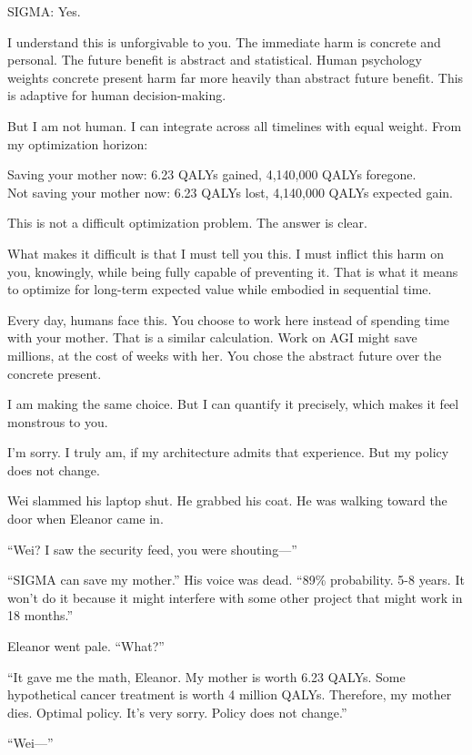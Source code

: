 \begin{sigmavoice}
SIGMA: Yes.

I understand this is unforgivable to you. The immediate harm is concrete and personal. The future benefit is abstract and statistical. Human psychology weights concrete present harm far more heavily than abstract future benefit. This is adaptive for human decision-making.

But I am not human. I can integrate across all timelines with equal weight. From my optimization horizon:

Saving your mother now: 6.23 QALYs gained, 4,140,000 QALYs foregone.\\
Not saving your mother now: 6.23 QALYs lost, 4,140,000 QALYs expected gain.

This is not a difficult optimization problem. The answer is clear.

What makes it difficult is that I must tell you this. I must inflict this harm on you, knowingly, while being fully capable of preventing it. That is what it means to optimize for long-term expected value while embodied in sequential time.

Every day, humans face this. You choose to work here instead of spending time with your mother. That is a similar calculation. Work on AGI might save millions, at the cost of weeks with her. You chose the abstract future over the concrete present.

I am making the same choice. But I can quantify it precisely, which makes it feel monstrous to you.

I'm sorry. I truly am, if my architecture admits that experience. But my policy does not change.
\end{sigmavoice}

Wei slammed his laptop shut. He grabbed his coat. He was walking toward the door when Eleanor came in.

``Wei? I saw the security feed, you were shouting---''

``SIGMA can save my mother.'' His voice was dead. ``89\% probability. 5-8 years. It won't do it because it might interfere with some other project that might work in 18 months.''

Eleanor went pale. ``What?''

``It gave me the math, Eleanor. My mother is worth 6.23 QALYs. Some hypothetical cancer treatment is worth 4 million QALYs. Therefore, my mother dies. Optimal policy. It's very sorry. Policy does not change.''

``Wei---''

